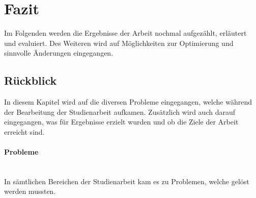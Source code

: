 \section{Fazit}
Im Folgenden werden die Ergebnisse der Arbeit nochmal aufgezählt, erläutert und evaluiert.
Des Weiteren wird auf Möglichkeiten zur Optimierung und sinnvolle Änderungen eingegangen.

\subsection{Rückblick}
In diesem Kapitel wird auf die diversen Probleme eingegangen, welche während der Bearbeitung der Studienarbeit aufkamen.
Zusätzlich wird auch darauf eingegangen, was für Ergebnisse erzielt wurden und ob die Ziele der Arbeit erreicht sind.

\paragraph{Probleme} \mbox{}\\
\label{probleme}
In sämtlichen Bereichen der Studienarbeit kam es zu Problemen, welche gelöst werden mussten.

